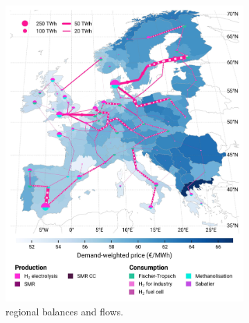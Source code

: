\documentclass[preprint,12pt,sort&compress]{elsarticle}
\begin{document}
\begin{figure}[htbp]
  \centering
  \begin{subfigure}[t]{0.49\textwidth}
      \vspace{0pt}
      \includegraphics[width=1\textwidth]{maps/pcipmi-national-international-expansion/base_s_adm___2050-balance_map_H2}
      \vspace{-0.5cm}
      \caption{ regional balances and flows.}
      \label{fig:PCI-in_lt_2050_h2}
  \end{subfigure}
  \hfill
  \begin{subfigure}[t]{0.49\textwidth}
      \vspace{0pt}

\end{subfigure}
\end{figure}
\end{document}
